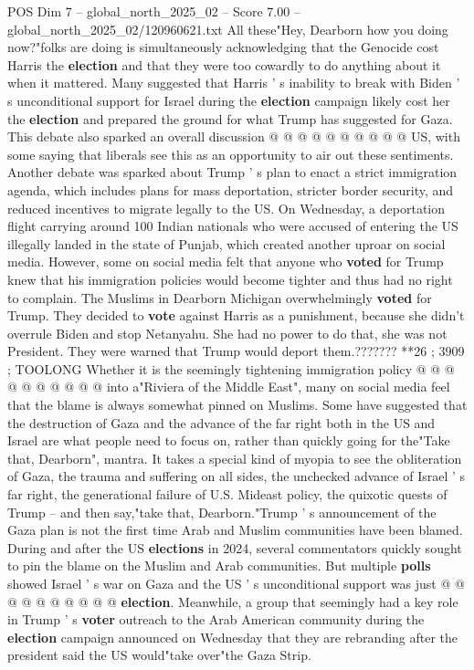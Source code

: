 \begin{textsample}{POS Dim 7 – global\_north\_2025\_02 – Score 7.00 – global\_north\_2025\_02/120960621.txt}
All these"Hey, Dearborn how you doing now?"folks are doing is simultaneously acknowledging that the Genocide cost Harris the \textbf{election} and that they were too cowardly to do anything about it when it mattered.
Many suggested that Harris ' s inability to break with Biden ' s unconditional support for Israel during the \textbf{election} campaign likely cost her the \textbf{election} and prepared the ground for what Trump has suggested for Gaza.
This debate also sparked an overall discussion @ @ @ @ @ @ @ @ @ @ US, with some saying that liberals see this as an opportunity to air out these sentiments.
Another debate was sparked about Trump ' s plan to enact a strict immigration agenda, which includes plans for mass deportation, stricter border security, and reduced incentives to migrate legally to the US.
On Wednesday, a deportation flight carrying around 100 Indian nationals who were accused of entering the US illegally landed in the state of Punjab, which created another uproar on social media.
However, some on social media felt that anyone who \textbf{voted} for Trump knew that his immigration policies would become tighter and thus had no right to complain.
The Muslims in Dearborn Michigan overwhelmingly \textbf{voted} for Trump.
They decided to \textbf{vote} against Harris as a punishment, because she didn't overrule Biden and stop Netanyahu.
She had no power to do that, she was not President.
They were warned that Trump would deport them.??????? **26 ; 3909 ; TOOLONG Whether it is the seemingly tightening immigration policy @ @ @ @ @ @ @ @ @ @ into a"Riviera of the Middle East", many on social media feel that the blame is always somewhat pinned on Muslims.
Some have suggested that the destruction of Gaza and the advance of the far right both in the US and Israel are what people need to focus on, rather than quickly going for the"Take that, Dearborn", mantra.
It takes a special kind of myopia to see the obliteration of Gaza, the trauma and suffering on all sides, the unchecked advance of Israel ' s far right, the generational failure of U.S.
Mideast policy, the quixotic quests of Trump -- and then say,"take that, Dearborn."Trump ' s announcement of the Gaza plan is not the first time Arab and Muslim communities have been blamed.
During and after the US \textbf{elections} in 2024, several commentators quickly sought to pin the blame on the Muslim and Arab communities.
But multiple \textbf{polls} showed Israel ' s war on Gaza and the US ' s unconditional support was just @ @ @ @ @ @ @ @ @ @ \textbf{election}.
Meanwhile, a group that seemingly had a key role in Trump ' s \textbf{voter} outreach to the Arab American community during the \textbf{election} campaign announced on Wednesday that they are rebranding after the president said the US would"take over"the Gaza Strip.

\end{textsample}
